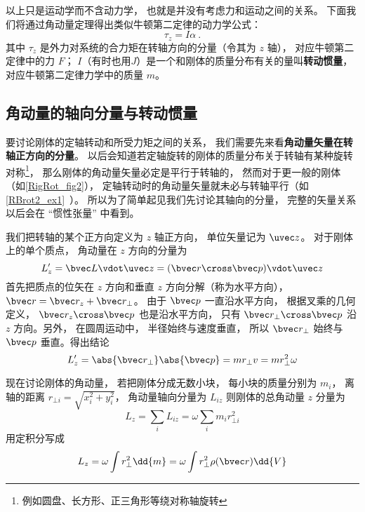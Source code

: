 以上只是运动学而不含动力学， 也就是并没有考虑力和运动之间的关系。 下面我们将通过角动量定理得出类似牛顿第二定律的动力学公式：
\begin{equation}
\tau_z = I \alpha~.
\end{equation}
其中 $\tau_z$ 是外力对系统的合力矩在转轴方向的分量（令其为 $z$ 轴）， 对应牛顿第二定律中的力 $F$； $I$（有时也用$J$）是一个和刚体的质量分布有关的量叫\textbf{转动惯量}， 对应牛顿第二定律力学中的质量 $m$。

\subsection{角动量的轴向分量与转动惯量}
要讨论刚体的定轴转动和所受力矩之间的关系， 我们需要先来看\textbf{角动量矢量在转轴正方向的分量}。 以后会知道若定轴旋转的刚体的质量分布关于转轴有某种旋转对称\footnote{例如圆盘、长方形、正三角形等绕对称轴旋转}， 那么刚体的角动量矢量必定是平行于转轴的， 然而对于更一般的刚体（如\autoref{RigRot_fig2}）， 定轴转动时的角动量矢量就未必与转轴平行（如\autoref{RBrot2_ex1}~）。 所以为了简单起见我们先讨论其轴向的分量， 完整的矢量关系以后会在 “惯性张量” 中看到。

我们把转轴的某个正方向定义为 $z$ 轴正方向， 单位矢量记为 $\uvec z$。 对于刚体上的单个质点， 角动量在 $z$ 方向的分量为
\begin{equation}
L'_{z} = \bvec L \vdot \uvec z = (\bvec r \cross \bvec p) \vdot \uvec z
\end{equation}
首先把质点的位矢在 $z$ 方向和垂直 $z$ 方向分解（称为水平方向）， $\bvec r = \bvec r_z + \bvec r_ \bot$。 由于 $\bvec p$ 一直沿水平方向， 根据叉乘的几何定义， $\bvec r_z \cross \bvec p$ 也是沿水平方向， 只有 $\bvec r_ \bot \cross \bvec p$ 沿 $z$ 方向。另外， 在圆周运动中， 半径始终与速度垂直， 所以 $\bvec r_ \bot$ 始终与 $\bvec p$ 垂直。得出结论
\begin{equation}
L'_z = \abs{\bvec r_\bot} \abs{\bvec p} = m r_ \bot v = mr_ \bot ^2\omega 
\end{equation}

现在讨论刚体的角动量， 若把刚体分成无数小块， 每小块的质量分别为 $m_i$， 离轴的距离 $r_{\bot i} = \sqrt{x_i^2 + y_i^2} $， 角动量轴向分量为 $L_{iz}$ 则刚体的总角动量 $z$ 分量为
\begin{equation}
L_z = \sum_i L_{iz} = \omega \sum_i m_i r_{ \bot i}^2
\end{equation}
用定积分写成
\begin{equation}
L_z = \omega \int r_ \bot ^2 \dd{m} = \omega \int r_ \bot ^2\rho(\bvec r)  \dd{V} 
\end{equation}

